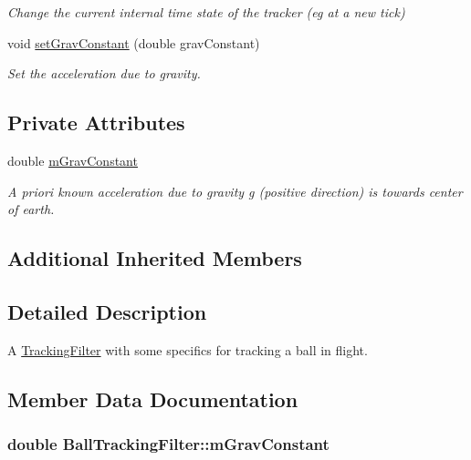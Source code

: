 \begin{DoxyCompactItemize}
\begin{DoxyCompactList}\small\item\em Change the current internal time state of the tracker (eg at a new tick) \end{DoxyCompactList}\item 
void \hyperlink{classBallTrackingFilter_a2191f6b71ad99e6b42ab5ad27d77da0b}{set\+Grav\+Constant} (double grav\+Constant)\hypertarget{classBallTrackingFilter_a2191f6b71ad99e6b42ab5ad27d77da0b}{}\label{classBallTrackingFilter_a2191f6b71ad99e6b42ab5ad27d77da0b}

\begin{DoxyCompactList}\small\item\em Set the acceleration due to gravity. \end{DoxyCompactList}\end{DoxyCompactItemize}
\subsection*{Private Attributes}
\begin{DoxyCompactItemize}
\item 
double \hyperlink{classBallTrackingFilter_a1c72b8147427133ec277217f299c830c}{m\+Grav\+Constant}
\begin{DoxyCompactList}\small\item\em A priori known acceleration due to gravity g (positive direction) is towards center of earth. \end{DoxyCompactList}\end{DoxyCompactItemize}
\subsection*{Additional Inherited Members}


\subsection{Detailed Description}
A \hyperlink{classTrackingFilter}{Tracking\+Filter} with some specifics for tracking a ball in flight. 

\subsection{Member Data Documentation}
\subsubsection[{\texorpdfstring{m\+Grav\+Constant}{mGravConstant}}]{\setlength{\rightskip}{0pt plus 5cm}double Ball\+Tracking\+Filter\+::m\+Grav\+Constant\hspace{0.3cm}{\ttfamily [private]}}\hypertarget{classBallTrackingFilter_a1c72b8147427133ec277217f299c830c}{}\label{classBallTrackingFilter_a1c72b8147427133ec277217f299c830c}


